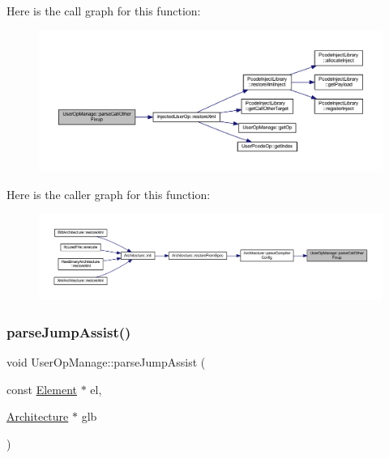 Here is the call graph for this function\+:
\nopagebreak
\begin{figure}[H]
\begin{center}
\leavevmode
\includegraphics[width=350pt]{class_user_op_manage_ad692cedd6253a601e45116ed8dc402bd_cgraph}
\end{center}
\end{figure}
Here is the caller graph for this function\+:
\nopagebreak
\begin{figure}[H]
\begin{center}
\leavevmode
\includegraphics[width=350pt]{class_user_op_manage_ad692cedd6253a601e45116ed8dc402bd_icgraph}
\end{center}
\end{figure}
\mbox{\label{class_user_op_manage_ad51fcfacc1f75bb23dcad875eda155f9}} 
\subsubsection{\texorpdfstring{parseJumpAssist()}{parseJumpAssist()}}
{\footnotesize\ttfamily void User\+Op\+Manage\+::parse\+Jump\+Assist (\begin{DoxyParamCaption}\item[{const \mbox{\hyperlink{class_element}{Element}} $\ast$}]{el,  }\item[{\mbox{\hyperlink{class_architecture}{Architecture}} $\ast$}]{glb }\end{DoxyParamCaption})}



